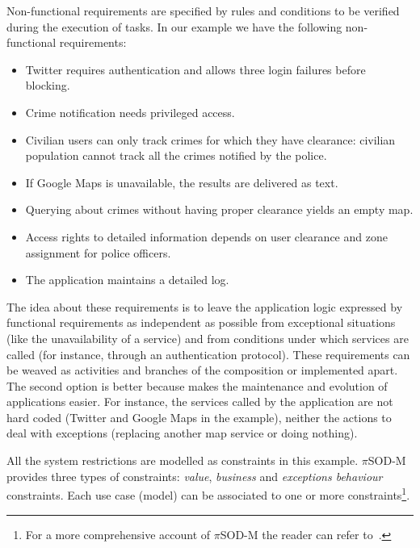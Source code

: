 Non-functional requirements are specified by rules and conditions to be verified during the execution of tasks.
In our example we have the following non-functional requirements:
\begin{itemize}
\item Twitter requires authentication and allows three login failures before blocking. 
\item Crime notification needs privileged access.
\item Civilian users can only track crimes for which they have clearance: civilian population cannot track all the crimes notified by the police. 
\item If \textsf{Google Maps} is unavailable, the results are delivered as text. 
\item Querying about crimes without having proper clearance yields an empty map.
\item Access rights to detailed information depends on user clearance and zone assignment for police officers. 
\item The application maintains a detailed log. 
\end{itemize}
The idea about these requirements is to leave the application logic expressed by functional requirements as independent as possible from exceptional situations (like the unavailability of a service) and from conditions under which services are called (for instance, through an authentication protocol). These requirements can be  weaved as activities and branches of the composition or implemented apart. The second option is better because makes the maintenance and evolution of applications easier. For instance, the services called by the application are not hard coded (\textsf{Twitter} and \textsf{Google Maps} in the example), neither the actions to deal with exceptions (replacing another map service or doing nothing).

All the system restrictions are modelled as constraints in this example. 
$\pi$SOD-M provides three types of constraints:
\textit{value}, \textit{business} and \textit{exceptions behaviour} constraints.
Each use case (model) can be associated to one or more constraints\footnote{For a more comprehensive account of $\pi$SOD-M the reader can refer to~\cite{PlacidoThesis2012}.}.
